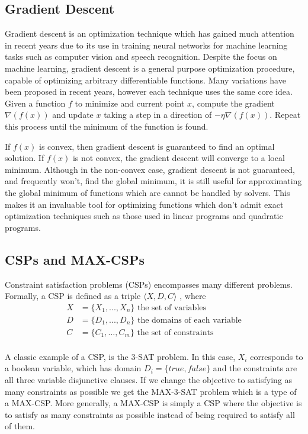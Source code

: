\documentclass[a4paper]{article}
\begin{document}
\subsection{Gradient Descent}

Gradient descent is an optimization technique which has gained much attention
in recent years due to  its use in training neural
networks for machine learning tasks such as computer vision and speech
recognition. Despite the focus on machine learning, gradient descent is a
general purpose optimization procedure, capable of optimizing arbitrary
differentiable functions. Many variations have been proposed in recent years,
however each technique uses the same core idea. Given a function $f$ to minimize and
current point $x$, compute the gradient $\nabla(f(x))$
and update $x$ taking a step in a direction of $-\eta \nabla(f(x))$. Repeat
this process until the minimum of the function is found. 

If $f(x)$ is convex, then gradient descent is guaranteed to find an optimal
solution. If $f(x)$ is not convex, the gradient descent will converge to a
local minimum. Although in the non-convex case, gradient descent is not
guaranteed, and frequently won't, find the global minimum, it is still useful for
approximating the global minimum of functions which are cannot be handled by solvers.
This makes it an invaluable tool for optimizing functions which don't admit
exact optimization techniques such as those used in linear programs and
quadratic programs.

\subsection{CSPs and MAX-CSPs}

Constraint satisfaction problems (CSPs) encompasses many different problems. Formally, a 
CSP is defined as a triple $\langle X, D, C \rangle$ \cite{wiki_CSP}, where 
\begin{align*}
	X &= \{X_1, ..., X_n\} \text{ the set of variables}\\
	D &= \{D_1, ..., D_n\} \text{ the domains of each variable}\\
	C &= \{C_1, ..., C_m\} \text{ the set of constraints}\\
\end{align*}

A classic example of a CSP, is the 3-SAT problem. In this case, 
$X_i$ corresponds to a boolean variable, which has domain $D_i = \{true, false\}$
and the constraints are all three variable disjunctive clauses. If we change the objective to satisfying as 
many constraints as possible we get the MAX-3-SAT problem which is a type of a 
MAX-CSP. More generally, a MAX-CSP is simply a CSP where the objective is to 
satisfy as many constraints as possible instead of being required to satisfy all 
of them.
\end{document}
